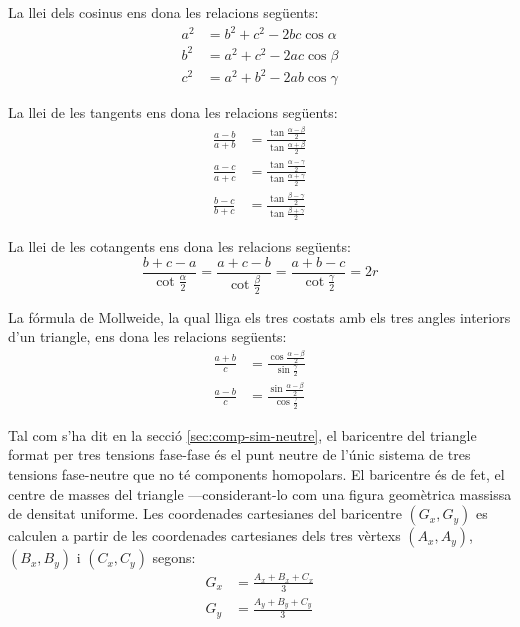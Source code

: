 La llei dels cosinus ens dona les relacions següents:
\begin{subequations}
\begin{align}
    a^2 &= b^2 + c^2 - 2 b c \cos\alpha \\[1ex]
    b^2 &= a^2 + c^2 - 2 a c \cos\beta \\[1ex]
    c^2 &= a^2 + b^2 - 2 a b \cos\gamma
\end{align}
\end{subequations}

La llei de les tangents ens dona les relacions següents:
\begin{subequations}
\begin{align}
    \frac{a-b}{a+b} &= \frac{\tan\frac{\alpha-\beta}{2}}{\tan\frac{\alpha+\beta}{2}} \\[1ex]
    \frac{a-c}{a+c} &= \frac{\tan\frac{\alpha-\gamma}{2}}{\tan\frac{\alpha+\gamma}{2}} \\[1ex]
    \frac{b-c}{b+c} &= \frac{\tan\frac{\beta-\gamma}{2}}{\tan\frac{\beta+\gamma}{2}}
\end{align}
\end{subequations}

La llei de les cotangents ens dona les relacions següents:
\begin{equation}
    \frac{b+c-a}{\cot\frac{\alpha}{2}} = \frac{a+c-b}{\cot\frac{\beta}{2}} =
    \frac{a+b-c}{\cot\frac{\gamma}{2}} = 2 r
\end{equation}

La fórmula de Mollweide, la qual lliga els tres costats amb els tres angles interiors d'un triangle, ens dona les relacions següents:
\begin{subequations}
\begin{align}
    \frac{a+b}{c} &= \frac{\cos\frac{\alpha-\beta}{2}}{\sin\frac{\gamma}{2}} \\[1ex]
    \frac{a-b}{c} &= \frac{\sin\frac{\alpha-\beta}{2}}{\cos\frac{\gamma}{2}}
\end{align}
\end{subequations}

Tal com s'ha dit en la secció \vref{sec:comp-sim-neutre}, el baricentre del triangle format per tres tensions fase-fase és el punt neutre de l'únic sistema de tres tensions fase-neutre que no té components homopolars. El baricentre és de fet, el centre de masses del triangle ---considerant-lo com una figura geomètrica massissa de densitat uniforme.  Les coordenades cartesianes del baricentre $(G_x,G_y)$ es calculen a partir de les coordenades cartesianes dels tres vèrtexs $(A_x,A_y)$, $(B_x,B_y)$ i $(C_x,C_y)$ segons:
\begin{subequations}
\begin{align}
    G_x &= \frac{A_x + B_x + C_x}{3} \label{eq:bari_x}\\[1ex]
    G_y &= \frac{A_y + B_y + C_y}{3} \label{eq:bari_y}
\end{align}
\end{subequations}

